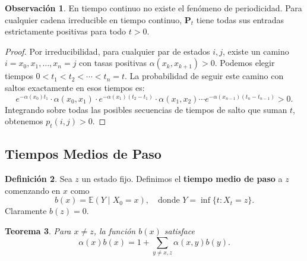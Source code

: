 \documentclass{article}
\theoremstyle{plain}
\newtheorem{Teorema}{Teorema}[section]
\theoremstyle{definition}
\newtheorem{Definicion}[Teorema]{Definici\'on}
\newtheorem{Observacion}[Teorema]{Observaci\'on}
\newcommand{\E}{\mathbb{E}}
\newcommand{\PP}{\mathbf{P}}
\begin{document}
\begin{Observacion}
  En tiempo continuo no existe el fen\'omeno de periodicidad. Para cualquier cadena irreducible en tiempo continuo, $\PP_t$ tiene todas sus entradas estrictamente positivas para todo $t > 0$.
\end{Observacion}

\begin{proof}
  Por irreducibilidad, para cualquier par de estados $i, j$, existe un camino $i = x_0, x_1, \ldots, x_n = j$ con tasas positivas $\alpha(x_k, x_{k+1}) > 0$. Podemos elegir tiempos $0 < t_1 < t_2 < \cdots < t_n = t$. La probabilidad de seguir este camino con saltos exactamente en esos tiempos es:
  \[ e^{-\alpha(x_0)t_1} \cdot \alpha(x_0,x_1) \cdot e^{-\alpha(x_1)(t_2-t_1)} \cdot \alpha(x_1,x_2) \cdots e^{-\alpha(x_{n-1})(t_n-t_{n-1})} > 0. \]
  Integrando sobre todas las posibles secuencias de tiempos de salto que suman $t$, obtenemos $p_t(i,j) > 0$.
\end{proof}

\subsection{Tiempos Medios de Paso}

\begin{Definicion}
  Sea $z$ un estado fijo. Definimos el \textbf{tiempo medio de paso} a $z$ comenzando en $x$ como
  \[ b(x) = \E(Y \mid X_0 = x), \quad \text{donde } Y = \inf\{t: X_t = z\}. \]
  Claramente $b(z) = 0$.
\end{Definicion}

\begin{Teorema}
  Para $x \neq z$, la funci\'on $b(x)$ satisface
  \[ \alpha(x)b(x) = 1 + \sum_{y \neq x, z} \alpha(x,y) b(y). \]
\end{Teorema}
\end{document}
